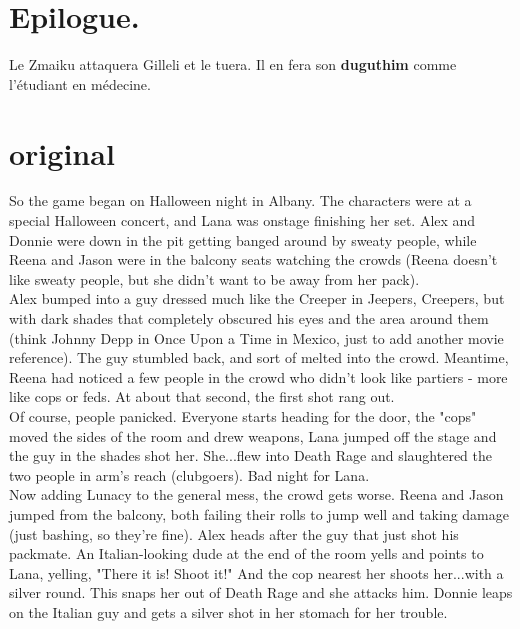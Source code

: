 \documentclass[oneside,12pt]{book}
\begin{document}
\begin{flushleft}
\section{Epilogue.}
Le Zmaiku attaquera Gilleli et le tuera. Il en fera son \textbf{duguthim} comme l'étudiant en médecine. 












\section {original }
So the game began on Halloween night in Albany. The characters were at a special Halloween concert, and Lana was onstage finishing her set. Alex and Donnie were down in the pit getting banged around by sweaty people, while Reena and Jason were in the balcony seats watching the crowds (Reena doesn't like sweaty people, but she didn't want to be away from her pack).\\


Alex bumped into a guy dressed much like the Creeper in Jeepers, Creepers, but with dark shades that completely obscured his eyes and the area around them (think Johnny Depp in Once Upon a Time in Mexico, just to add another movie reference). The guy stumbled back, and sort of melted into the crowd. Meantime, Reena had noticed a few people in the crowd who didn't look like partiers - more like cops or feds. At about that second, the first shot rang out.\\


Of course, people panicked. Everyone starts heading for the door, the "cops" moved the sides of the room and drew weapons, Lana jumped off the stage and the guy in the shades shot her. She...flew into Death Rage and slaughtered the two people in arm's reach (clubgoers). Bad night for Lana.\\


Now adding Lunacy to the general mess, the crowd gets worse. Reena and Jason jumped from the balcony, both failing their rolls to jump well and taking damage (just bashing, so they're fine). Alex heads after the guy that just shot his packmate. An Italian-looking dude at the end of the room yells and points to Lana, yelling, "There it is! Shoot it!" And the cop nearest her shoots her...with a silver round. This snaps her out of Death Rage and she attacks him. Donnie leaps on the Italian guy and gets a silver shot in her stomach for her trouble.\\



\end{flushleft}
\end{document}
